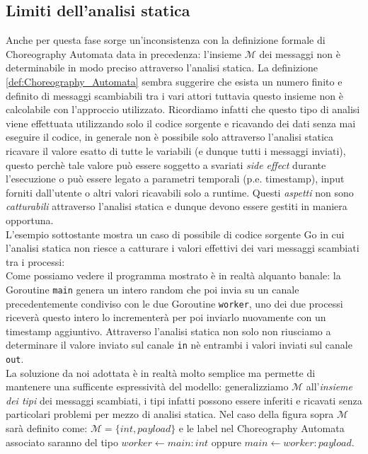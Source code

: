 \subsection{Limiti dell'analisi statica} \label{subsec:Static_Analysis_Limits}
Anche per questa fase sorge un'inconsistenza con la definizione formale di Choreography Automata data in precedenza: l'insieme $\mathcal{M}$ dei messaggi non è determinabile in modo preciso attraverso l'analisi statica. La definizione \ref{def:Choreography_Automata} sembra suggerire che esista un numero finito e definito di messaggi scambiabili tra i vari attori tuttavia questo insieme non è calcolabile con l'approccio utilizzato.
Ricordiamo infatti che questo tipo di analisi viene effettuata utilizzando solo il codice sorgente e ricavando dei dati senza mai eseguire il codice, in generale non è possibile solo attraverso l'analisi statica ricavare il valore esatto di tutte le variabili (e dunque tutti i messaggi inviati), questo perchè tale valore può essere soggetto a svariati \emph{side effect} durante l'esecuzione o può essere legato a parametri temporali (p.e. timestamp), input forniti dall'utente o altri valori ricavabili solo a runtime. Questi \emph{aspetti} non sono \emph{catturabili} attraverso l'analisi statica e dunque devono essere  gestiti in maniera opportuna. \bigskip \\
L'esempio sottostante mostra un caso di possibile di codice sorgente Go in cui l'analisi statica non riesce a catturare i valori effettivi dei vari messaggi scambiati tra i processi: \\

\bigskip
Come possiamo vedere il programma mostrato è in realtà alquanto banale: la Goroutine \texttt{main} genera un intero random che poi invia su un canale precedentemente condiviso con le due Goroutine \texttt{worker}, uno dei due processi riceverà questo intero lo incrementerà per poi inviarlo nuovamente con un timestamp aggiuntivo. Attraverso l'analisi statica non solo non riusciamo a determinare il valore inviato sul canale \texttt{in} nè entrambi i valori inviati sul canale \texttt{out}. \bigskip \\
La soluzione da noi adottata è in realtà molto semplice ma permette di mantenere una sufficente espressività del modello: generalizziamo $\mathcal{M}$ all'\emph{insieme dei tipi} dei messaggi scambiati, i tipi infatti possono essere inferiti e ricavati senza particolari problemi per mezzo di analisi statica. Nel caso della figura sopra $\mathcal{M}$ sarà definito come: $\mathcal{M} = \{ int, payload \}$ e le label nel Choreography Automata associato saranno del tipo $worker \leftarrow main : int$ oppure $main \leftarrow worker : payload$.

